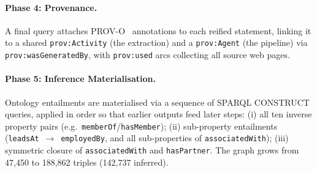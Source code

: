 \paragraph{Phase 4: Provenance.}
\label{sec:construction:provenance}
A final query attaches PROV-O~\cite{provo} annotations to each reified statement, linking it to a shared \texttt{prov:Activity} (the extraction) and a \texttt{prov:Agent} (the pipeline) via \texttt{prov:wasGeneratedBy}, with \texttt{prov:used} arcs collecting all source web pages.

\begin{sloppypar}\paragraph{Phase 5: Inference Materialisation.}
\label{sec:construction:inference}
Ontology entailments are materialised via a sequence of SPARQL CONSTRUCT queries, applied in order so that earlier outputs feed later steps: (i) all ten inverse property pairs (e.g.\ \texttt{memberOf}/\texttt{hasMember}); (ii) sub-property entailments (\texttt{leadsAt}~$\to$~\texttt{employedBy}, and all sub-properties of \texttt{associatedWith}); (iii) symmetric closure of \texttt{associatedWith} and \texttt{hasPartner}.
The graph grows from 47,450 to 188,862 triples (142,737 inferred).\end{sloppypar}